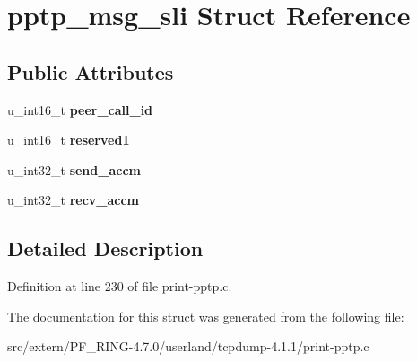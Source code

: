 \hypertarget{structpptp__msg__sli}{
\section{pptp\_\-msg\_\-sli Struct Reference}
\label{structpptp__msg__sli}
}
\subsection*{Public Attributes}
\begin{DoxyCompactItemize}
\item 
\hypertarget{structpptp__msg__sli_a05042453afaaa9fb3927ce02446a85cb}{
u\_\-int16\_\-t {\bfseries peer\_\-call\_\-id}}
\label{structpptp__msg__sli_a05042453afaaa9fb3927ce02446a85cb}

\item 
\hypertarget{structpptp__msg__sli_a04742e75c8e466a477235b59e8c3c11f}{
u\_\-int16\_\-t {\bfseries reserved1}}
\label{structpptp__msg__sli_a04742e75c8e466a477235b59e8c3c11f}

\item 
\hypertarget{structpptp__msg__sli_ad2bcc44380e5764f42cd8bbd2968ab7f}{
u\_\-int32\_\-t {\bfseries send\_\-accm}}
\label{structpptp__msg__sli_ad2bcc44380e5764f42cd8bbd2968ab7f}

\item 
\hypertarget{structpptp__msg__sli_a4662d020b6969a735fb94e58295fdc45}{
u\_\-int32\_\-t {\bfseries recv\_\-accm}}
\label{structpptp__msg__sli_a4662d020b6969a735fb94e58295fdc45}

\end{DoxyCompactItemize}


\subsection{Detailed Description}


Definition at line 230 of file print-\/pptp.c.



The documentation for this struct was generated from the following file:\begin{DoxyCompactItemize}
\item 
src/extern/PF\_\-RING-\/4.7.0/userland/tcpdump-\/4.1.1/print-\/pptp.c\end{DoxyCompactItemize}

